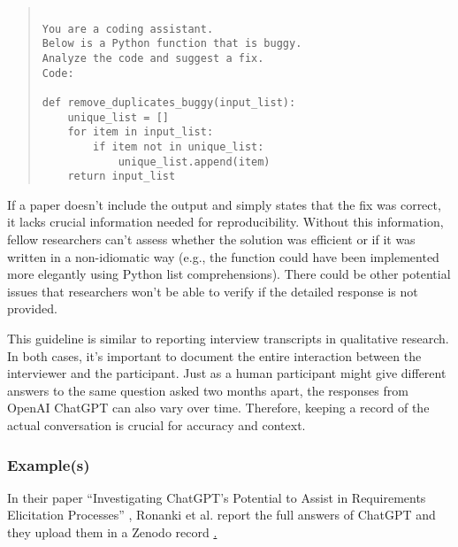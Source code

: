 \begin{quote}
\begin{verbatim}

You are a coding assistant. 
Below is a Python function that is buggy. 
Analyze the code and suggest a fix.
Code:

def remove_duplicates_buggy(input_list):
    unique_list = []
    for item in input_list:
        if item not in unique_list:
            unique_list.append(item)
    return input_list 

\end{verbatim}
\end{quote}

If a paper doesn't include the output and simply states that the fix was correct, it lacks crucial information needed for reproducibility. Without this information, fellow researchers can't assess whether the solution was efficient or if it was written in a non-idiomatic way (e.g., the function could have been implemented more elegantly using Python list comprehensions). There could be other potential issues that researchers won't be able to verify if the detailed response is not provided.

This guideline is similar to reporting interview transcripts in qualitative research. In both cases, it's important to document the entire interaction between the interviewer and the participant. Just as a human participant might give different answers to the same question asked two months apart, the responses from OpenAI ChatGPT can also vary over time. Therefore, keeping a record of the actual conversation is crucial for accuracy and context.



\subsubsection{Example(s)}

In their paper ``Investigating ChatGPT's Potential to Assist in Requirements Elicitation Processes'' \cite{ronanki2023investigating}, Ronanki et al. report the full answers of ChatGPT and they upload them in a Zenodo record \href{https://zenodo.org/records/8124936}. 

